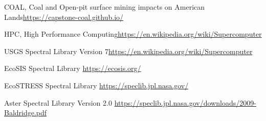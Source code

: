 \documentclass[a4paper,12pt]{article}
\begin{document}
\noindent [4] COAL, Coal and Open-pit surface mining impacts on American Lands\newline \url{https://capstone-coal.github.io/} \newline

\noindent [5] HPC, High Performance Computing\newline \url{https://en.wikipedia.org/wiki/Supercomputer}\newline

\noindent [6] USGS Spectral Library Version 7\newline \url{https://en.wikipedia.org/wiki/Supercomputer}\newline

\noindent [7] EcoSIS Spectral Library \newline \url{https://ecosis.org/}\newline

\noindent [8] EcoSTRESS Spectral Library \newline \url{https://speclib.jpl.nasa.gov/}\newline

\noindent [9] Aster Spectral Library Version 2.0 \newline
\url{https://speclib.jpl.nasa.gov/downloads/2009-Baldridge.pdf}\newline
\end{document}

